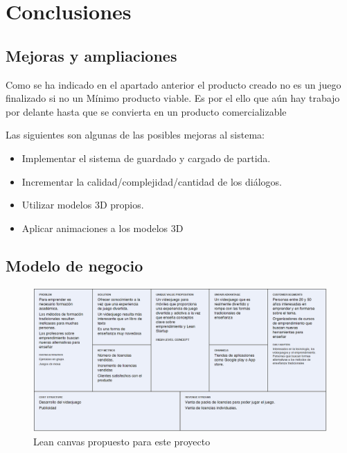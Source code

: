 \chapter{Conclusiones}

\section{Mejoras y ampliaciones}

Como se ha indicado en el apartado anterior el producto creado no es un juego finalizado si no un Mínimo producto viable. Es por el ello que aún hay trabajo por delante hasta que se convierta en un producto comercializable

Las siguientes son algunas de las posibles mejoras al sistema:

\begin{itemize}
	\item Implementar el sistema de guardado y cargado de partida.
	\item Incrementar la calidad/complejidad/cantidad de los diálogos.
	\item Utilizar modelos 3D propios.
	\item Aplicar animaciones a los modelos 3D
\end{itemize}

\section{Modelo de negocio}




\begin{figure}[H]
\begin{center}
\includegraphics[scale=0.33]{imagenes/leanCanvasDaVinciStartup.png}
\caption{Lean canvas propuesto para este proyecto}
\label{leanCanvasDaVinci}
\end{center}
\end{figure}



